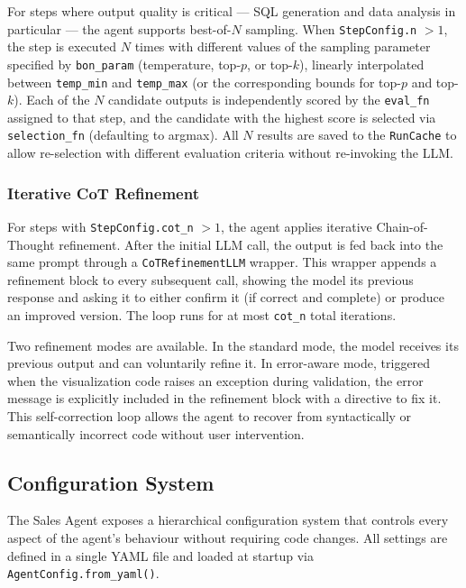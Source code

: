 \documentclass[11pt,a4paper]{article}
\begin{document}
For steps where output quality is critical — SQL generation and data analysis in
particular — the agent supports best-of-$N$ sampling. When \texttt{StepConfig.n}
$> 1$, the step is executed $N$ times with different values of the sampling parameter
specified by \texttt{bon\_param} (temperature, top-$p$, or top-$k$), linearly
interpolated between \texttt{temp\_min} and \texttt{temp\_max} (or the corresponding
bounds for top-$p$ and top-$k$). Each of the $N$ candidate outputs is independently
scored by the \texttt{eval\_fn} assigned to that step, and the candidate with the
highest score is selected via \texttt{selection\_fn} (defaulting to argmax). All $N$
results are saved to the \texttt{RunCache} to allow re-selection with different
evaluation criteria without re-invoking the LLM.

\subsubsection{Iterative CoT Refinement}

For steps with \texttt{StepConfig.cot\_n} $> 1$, the agent applies iterative
Chain-of-Thought refinement. After the initial LLM call, the output is fed back into
the same prompt through a \texttt{CoTRefinementLLM} wrapper. This wrapper appends a
refinement block to every subsequent call, showing the model its previous response
and asking it to either confirm it (if correct and complete) or produce an improved
version. The loop runs for at most \texttt{cot\_n} total iterations.

Two refinement modes are available. In the standard mode, the model receives its
previous output and can voluntarily refine it. In error-aware mode, triggered when
the visualization code raises an exception during validation, the error message is
explicitly included in the refinement block with a directive to fix it. This
self-correction loop allows the agent to recover from syntactically or semantically
incorrect code without user intervention.

\subsection{Configuration System}
\label{subsec:config}

The Sales Agent exposes a hierarchical configuration system that controls every
aspect of the agent's behaviour without requiring code changes. All settings are
defined in a single YAML file and loaded at startup via \texttt{AgentConfig.from\_yaml()}.
\end{document}
